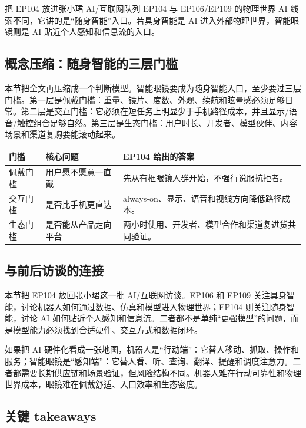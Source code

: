 \documentclass[a4paper]{article}
\begin{document}
\begin{importantbox}{把 EP104 放进张小珺 AI/互联网队列}
EP104 与 EP106/EP109 的物理世界 AI 线索不同，它讲的是“随身智能”入口。若具身智能是 AI 进入外部物理世界，智能眼镜则是 AI 贴近个人感知和信息流的入口。
\end{importantbox}

\subsection{概念压缩：随身智能的三层门槛}

本节把全文再压缩成一个判断模型。智能眼镜要成为随身智能入口，至少要过三层门槛。第一层是佩戴门槛：重量、镜片、度数、外观、续航和眩晕感必须足够日常。第二层是交互门槛：它必须在短任务上明显少于手机路径成本，并且显示/语音/触控组合足够自然。第三层是生态门槛：用户时长、开发者、模型伙伴、内容场景和渠道复购要能滚动起来。

\noindent\begin{tabularx}{\textwidth}{p{}p{}X}
\toprule
门槛 & 核心问题 & EP104 给出的答案 \\
\midrule
佩戴门槛 & 用户愿不愿意一直戴 & 先从有框眼镜人群开始，不强行说服抗拒者。 \\
交互门槛 & 是否比手机更直达 & always-on、显示、语音和视线方向降低路径成本。 \\
生态门槛 & 是否能从产品走向平台 & 两小时使用、开发者、模型合作和渠道复进货共同验证。 \\
\bottomrule
\end{tabularx}

\subsection{与前后访谈的连接}

本节把 EP104 放回张小珺这一批 AI/互联网访谈。EP106 和 EP109 关注具身智能，讨论机器人如何通过数据、仿真和模型进入物理世界；EP104 则关注随身智能，讨论 AI 如何贴近个人感知和信息流。二者都不是单纯“更强模型”的问题，而是模型能力必须找到合适硬件、交互方式和数据闭环。

如果把 AI 硬件化看成一张地图，机器人是“行动端”：它替人移动、抓取、操作和服务；智能眼镜是“感知端”：它替人看、听、查询、翻译、提醒和调度注意力。二者都需要长期供应链和场景验证，但风险结构不同。机器人难在行动可靠性和物理世界成本，眼镜难在佩戴舒适、入口效率和生态密度。

\subsection{关键 takeaways}
\end{document}
